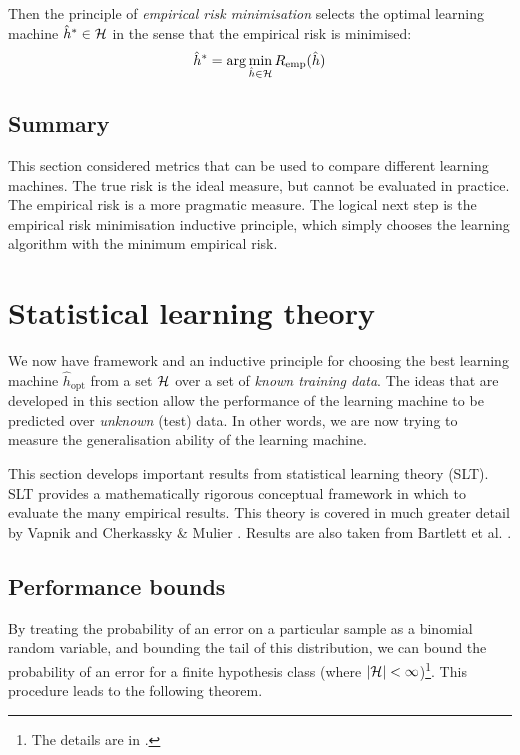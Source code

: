 Then the principle of \emph{empirical risk minimisation} selects the
optimal learning machine $\hat{h}^{\ast} \in \mathcal{H}$ in the sense that
the empirical risk is minimised:
%
\begin{equation}
\hat{h}^{\ast} = \arg \min_{\hat{h} \in \mathcal{H}} R_{\mathrm{emp}}(\hat{h})
\label{eqn:erm}
\end{equation}

\subsection{Summary}

This section considered metrics that can be used to compare different
learning machines.  The true risk is the ideal measure, but cannot be
evaluated in practice.  The empirical risk is a more pragmatic
measure.  The logical next step is the empirical risk minimisation
inductive principle, which simply chooses the learning algorithm with
the minimum empirical risk.





\section{Statistical learning theory}
\label{sec:slt}

We now have framework and an inductive principle for choosing the
best learning machine $\hat{h}_{\mbox{opt}}$ from a set $\mathcal{H}$ over a
set of \emph{known training data}.  The ideas that are developed in
this section allow the performance of the learning machine to be
predicted over \emph{unknown} (test) data.  In other words, we are now
trying to measure the generalisation ability of the learning machine.

This section develops important results from statistical learning
theory (SLT).  SLT provides a mathematically rigorous
conceptual framework in which to evaluate the many empirical results.
This theory is covered in much greater detail by Vapnik
\cite{Vapnik98} and Cherkassky \& Mulier \cite{Cherkassky98}.  Results
are also taken from Bartlett et al. \cite{Bartlett98a}.

\subsection{Performance bounds}

By treating the probability of an error on a particular sample as a
binomial random variable, and bounding the tail of this distribution,
we can bound the probability of an error for a finite hypothesis class
(where $|\mathcal{H}| < \infty$)\footnote{The details are in
\cite{Bartlett99b}.}.  This procedure leads to the following theorem.

